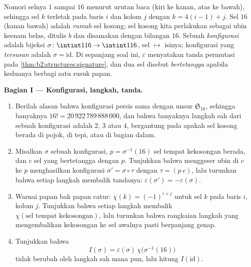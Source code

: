 \begin{problem}
\label{pb:b2:structures:1}
Nomori selnya $1$ sampai $16$ menurut urutan baca (kiri ke kanan, atas
ke bawah), sehingga sel $k$ terletak pada baris $i$ dan kolom $j$ dengan
$k = 4(i - 1) + j$. Sel $16$ (kanan bawah) adalah \emph{rumah}
sel kosong; sel kosong kita perlakukan sebagai ubin keenam belas,
ditulis $b$ dan disamakan dengan bilangan $16$. Sebuah
\emph{konfigurasi} adalah bijeksi $\sigma \colon \intint1{16}
\to \intint1{16}$, sel $\mapsto$ isinya; konfigurasi yang
\emph{tersusun} adalah $\sigma = \mathrm{id}$. Di sepanjang soal ini,
$\varepsilon$ menyatakan tanda permutasi pada
\cref{thm:b2:structures:signature}, dan dua sel disebut
\emph{bertetangga} apabila keduanya berbagi satu rusuk papan.

\medskip
\noindent\textbf{Bagian I --- Konfigurasi, langkah, tanda.}
\begin{enumerate}
  \item Berilah alasan bahwa konfigurasi persis sama dengan unsur
        $\mathfrak{S}_{16}$, sehingga banyaknya $16! =
        20\,922\,789\,888\,000$, dan bahwa banyaknya langkah sah dari
        sebuah konfigurasi adalah $2$, $3$ atau $4$,
        bergantung pada apakah sel kosong berada di pojok, di
        tepi, atau di bagian dalam.
  \item Misalkan $\sigma$ sebuah konfigurasi, $p = \sigma^{-1}(16)$ sel
        tempat kekosongan berada, dan $c$ sel yang bertetangga dengan
        $p$. Tunjukkan bahwa menggeser ubin di $c$ ke $p$ menghasilkan
        konfigurasi $\sigma' = \sigma \circ \tau$ dengan $\tau =
        (p\ c)$, lalu turunkan bahwa setiap langkah membalik tandanya:
        $\varepsilon(\sigma') = -\varepsilon(\sigma)$.
  \item Warnai papan bak papan catur: $\chi(k) = (-1)^{i+j}$ untuk sel
        $k$ pada baris $i$, kolom $j$. Tunjukkan bahwa setiap langkah
        membalik $\chi(\text{sel tempat kekosongan})$, lalu turunkan
        bahwa rangkaian langkah yang mengembalikan kekosongan ke sel
        awalnya pasti berpanjang genap.
  \item Tunjukkan bahwa
        \[
        I(\sigma) = \varepsilon(\sigma)\,
        \chi\bigl(\sigma^{-1}(16)\bigr)
        \]
        tidak berubah oleh langkah sah mana pun, lalu hitung
        $I(\mathrm{id})$.
\end{enumerate}


\end{problem}
